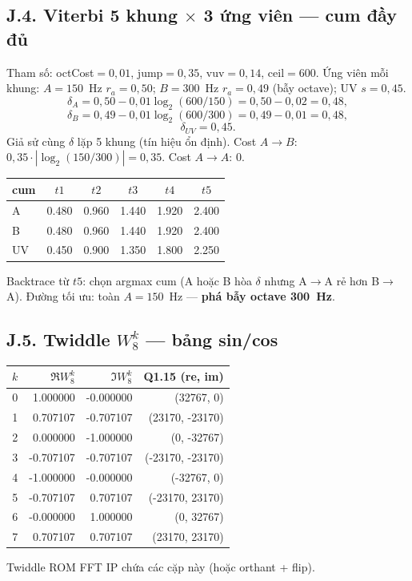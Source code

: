 \subsection*{J.4. Viterbi 5 khung $\times$ 3 ứng viên --- cum đầy đủ}
Tham số: octCost$=0{,}01$, jump$=0{,}35$, vuv$=0{,}14$, ceil$=600$.
Ứng viên mỗi khung: $A=150$~Hz $r_a=0{,}50$; $B=300$~Hz $r_a=0{,}49$ (bẫy octave); UV $s=0{,}45$.
\[
\delta_A=0{,}50-0{,}01\log_2(600/150)=0{,}50-0{,}02=0{,}48,
\]
\[
\delta_B=0{,}49-0{,}01\log_2(600/300)=0{,}49-0{,}01=0{,}48,
\]
\[
\delta_{UV}=0{,}45.
\]
Giả sử cùng $\delta$ lặp 5 khung (tín hiệu ổn định). Cost $A\to B$: $0{,}35\cdot|\log_2(150/300)|=0{,}35$. Cost $A\to A$: $0$.
\begin{center}\scriptsize
\begin{tabular}{@{}lccccc@{}}
\toprule
cum & $t1$ & $t2$ & $t3$ & $t4$ & $t5$ \\
\midrule
A & 0.480 & 0.960 & 1.440 & 1.920 & 2.400 \\
B & 0.480 & 0.960 & 1.440 & 1.920 & 2.400 \\
UV & 0.450 & 0.900 & 1.350 & 1.800 & 2.250 \\
\bottomrule
\end{tabular}
\end{center}
Backtrace từ $t5$: chọn argmax cum (A hoặc B hòa $\delta$ nhưng A$\to$A rẻ hơn B$\to$A). Đường tối ưu: toàn $A=150$~Hz --- \textbf{phá bẫy octave 300~Hz}.

\subsection*{J.5. Twiddle $W_8^k$ --- bảng sin/cos}
\begin{center}\scriptsize
\begin{tabular}{@{}rrrr@{}}
\toprule
$k$ & $\Re W_8^k$ & $\Im W_8^k$ & Q1.15 (re, im) \\
\midrule
0 & 1.000000 & -0.000000 & (32767, 0) \\
1 & 0.707107 & -0.707107 & (23170, -23170) \\
2 & 0.000000 & -1.000000 & (0, -32767) \\
3 & -0.707107 & -0.707107 & (-23170, -23170) \\
4 & -1.000000 & -0.000000 & (-32767, 0) \\
5 & -0.707107 & 0.707107 & (-23170, 23170) \\
6 & -0.000000 & 1.000000 & (0, 32767) \\
7 & 0.707107 & 0.707107 & (23170, 23170) \\
\bottomrule
\end{tabular}
\end{center}
Twiddle ROM FFT IP chứa các cặp này (hoặc orthant + flip).

